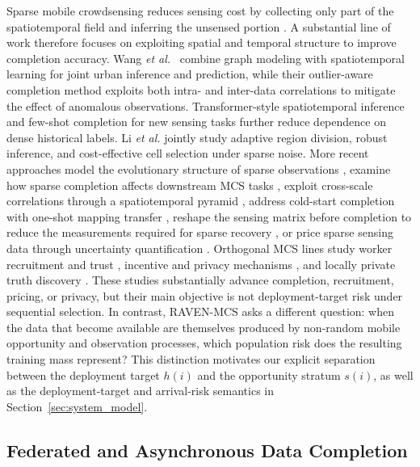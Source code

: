 \documentclass[letterpaper,journal]{IEEEtran}
\begin{document}
Sparse mobile crowdsensing reduces sensing cost by collecting only part of the
spatiotemporal field and inferring the unsensed portion
\cite{ganti2011mobile,guo2015mobile,ma2014opportunities}.  A substantial line of
work therefore focuses on exploiting spatial and temporal structure to improve
completion accuracy.  Wang \emph{et al.}~\cite{wang2023spatiotemporal} combine
graph modeling with spatiotemporal learning for joint urban inference and
prediction, while their outlier-aware completion method
\cite{wang2023outlier} exploits both intra- and inter-data correlations to
mitigate the effect of anomalous observations.  Transformer-style
spatiotemporal inference \cite{wang2023transformer} and few-shot completion for
new sensing tasks \cite{wang2024fewshot} further reduce dependence on dense
historical labels.  Li \emph{et al.}
\cite{li2024robust} jointly study adaptive region division, robust inference,
and cost-effective cell selection under sparse noise.  More recent approaches
model the evolutionary structure of sparse observations
\cite{wang2025evolutionary}, examine how sparse completion affects downstream
MCS tasks \cite{xu2025rethinking}, exploit cross-scale correlations through
a spatiotemporal pyramid \cite{liu2026pyramid}, address cold-start completion
with one-shot mapping transfer \cite{zhang2026mapt}, reshape the sensing matrix
before completion to reduce the measurements required for sparse recovery
\cite{tian2026reshaping}, or price sparse sensing
data through uncertainty quantification \cite{liu2026pricing}.
Orthogonal MCS lines study worker recruitment and trust
\cite{liu2026multidimensional}, incentive and privacy mechanisms
\cite{zhang2025incentive,lu2025piece}, and locally private truth discovery
\cite{zhang2026locally}.  These studies substantially
advance completion, recruitment, pricing, or privacy, but their main objective
is not deployment-target risk under sequential selection.
In contrast, RAVEN-MCS asks a different question: when the data that become
available are themselves produced by non-random mobile opportunity and
observation processes, which population risk does the resulting training mass
represent?  This distinction motivates our explicit separation between the
deployment target $h(i)$ and the opportunity stratum $s(i)$, as well as the
deployment-target and arrival-risk semantics in Section~\ref{sec:system_model}.

\subsection{Federated and Asynchronous Data Completion}
\end{document}
